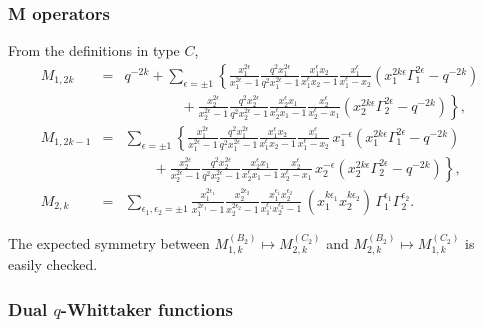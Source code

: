 \documentclass[12pt]{amsart}
\numberwithin{equation}{section}
\numberwithin{table}{section}
\begin{document}
\begin{appendix}
\subsubsection{M operators}
From the definitions in type $C$,
\begin{eqnarray*}
M_{1,2k}&=&q^{-2k}+\sum_{\epsilon=\pm 1} \left\{
\frac{x_1^{2\epsilon}}{x_1^{2\epsilon}-1}\frac{q^2x_1^{2\epsilon}}{q^2x_1^{2\epsilon}-1} 
\frac{x_1^\epsilon x_2}{x_1^\epsilon x_2 - 1}\frac{x_1^\epsilon }{x_1^\epsilon -x_2 }
(x_1^{2k \epsilon} \Gamma_1^{2\epsilon} -q^{-2k}) \right.\\
&&\qquad\qquad +\left. \frac{x_2^{2\epsilon}}{x_2^{2\epsilon}-1}\frac{q^2x_2^{2\epsilon}}{q^2x_2^{2\epsilon}-1} 
\frac{x_2^\epsilon x_1}{x_2^\epsilon x_1 - 1}\frac{x_2^\epsilon }{x_2^\epsilon -x_1 }
(x_2^{2k \epsilon} \Gamma_2^{2\epsilon} -q^{-2k})\right\},\\
M_{1,2k-1}&=&\sum_{\epsilon=\pm 1} \left\{
\frac{x_1^{2\epsilon}}{x_1^{2\epsilon}-1}\frac{q^2x_1^{2\epsilon}}{q^2x_1^{2\epsilon}-1} 
\frac{x_1^\epsilon x_2}{x_1^\epsilon x_2 - 1}\frac{x_1^\epsilon }{x_1^\epsilon -x_2 }\, x_1^{-\epsilon}
(x_1^{2k \epsilon} \Gamma_1^{2\epsilon} -q^{-2k})\right.\\
&&\qquad+\left. \frac{x_2^{2\epsilon}}{x_2^{2\epsilon}-1}\frac{q^2x_2^{2\epsilon}}{q^2x_2^{2\epsilon}-1} 
\frac{x_2^\epsilon x_1}{x_2^\epsilon x_1 - 1}\frac{x_2^\epsilon }{x_2^\epsilon -x_1 }\, x_2^{-\epsilon}
(x_2^{2k \epsilon} \Gamma_2^{2\epsilon} -q^{-2k})\right\},\\
M_{2,k}&=& \sum_{\epsilon_1,\epsilon_2=\pm 1} \frac{x_1^{2\epsilon_1}}{x_1^{2\epsilon_1}-1}\frac{x_2^{2\epsilon_2}}{x_2^{2\epsilon_2}-1}
\frac{x_1^{\epsilon_1}x_2^{\epsilon_2} }{x_1^{\epsilon_1}x_2^{\epsilon_2}-1}\, 
(x_1^{k\epsilon_1} x_2^{k\epsilon_2})\, \Gamma_1^{\epsilon_1}\Gamma_2^{\epsilon_2}.
\end{eqnarray*}

The expected symmetry between $M_{1,k}^{(B_2)}\mapsto M_{2,k}^{(C_2)}$ and 
$M_{2,k}^{(B_2)}\mapsto M_{1,k}^{(C_2)}$ is easily checked.

\subsubsection{Dual $q$-Whittaker functions}


\end{appendix}
\end{document}
